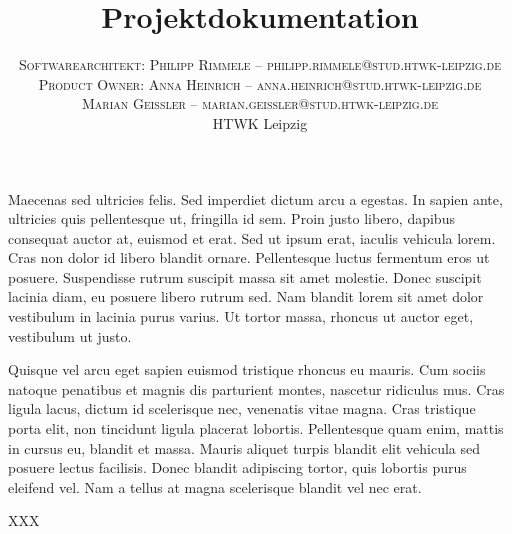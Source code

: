 \documentclass[twoside]{report}
\title{\vspace{-5mm}%
	\fontsize{24pt}{10pt}\selectfont
	\textbf{Projektdokumentation}
	}
\author{%
	\large
	\textsc{Softwarearchitekt: Philipp Rimmele -- philipp.rimmele@stud.htwk-leipzig.de} \\[2mm]
	\textsc{Product Owner: Anna Heinrich -- anna.heinrich@stud.htwk-leipzig.de} \\[2mm]
	\textsc{Marian Geißler -- marian.geissler@stud.htwk-leipzig.de} \\[2mm]
	\normalsize	HTWK Leipzig 
	}
\date{}
\begin{document}

\maketitle
\thispagestyle{fancy}

\tableofcontents



Maecenas sed ultricies felis. Sed imperdiet dictum arcu a egestas. 
In sapien ante, ultricies quis pellentesque ut, fringilla id sem. Proin justo libero, dapibus consequat auctor at, euismod et erat. Sed ut ipsum erat, iaculis vehicula lorem. Cras non dolor id libero blandit ornare. Pellentesque luctus fermentum eros ut posuere. Suspendisse rutrum suscipit massa sit amet molestie. Donec suscipit lacinia diam, eu posuere libero rutrum sed. Nam blandit lorem sit amet dolor vestibulum in lacinia purus varius. Ut tortor massa, rhoncus ut auctor eget, vestibulum ut justo.
\nsecend


Quisque vel arcu eget sapien euismod tristique rhoncus eu mauris. Cum sociis natoque penatibus et magnis dis parturient montes, nascetur ridiculus mus. Cras ligula lacus, dictum id scelerisque nec, venenatis vitae magna. Cras tristique porta elit, non tincidunt ligula placerat lobortis. Pellentesque quam enim, mattis in cursus eu, blandit et massa. Mauris aliquet turpis blandit elit vehicula sed posuere lectus facilisis. Donec blandit adipiscing tortor, quis lobortis purus eleifend vel. Nam a tellus at magna scelerisque blandit vel nec erat.
\nsecend




XXX
\nsecend

%
%
% 
\end{document}
